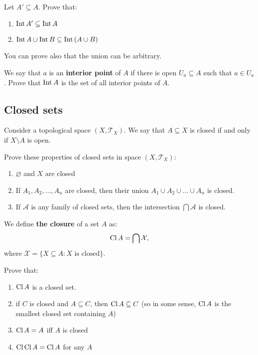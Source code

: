 \begin{prob}
  Let $A'\subseteq A$. Prove that:
  \begin{enumerate}
    \item $\text{Int\,} A' \subseteq \text{Int\,} A$
    \item $\text{Int\,} A \cup \text{Int\,} B\subseteq \text{Int\,} (A\cup B)$
  \end{enumerate}
  You can prove also that the union can be arbitrary.
\end{prob}

\begin{prob}
	We say that $a$ is an \textbf{interior point} of $A$ if there is open $U_a\subseteq A$ such that $a\in U_a$. Prove that $\text{Int\,} A$ is the set
	of all interior points of $A$.
\end{prob}

\subsection{Closed sets}
Consider a topological space $(X, \mathcal T_X)$. We say that $A\subseteq X$ is closed if and only if $X\setminus A$ is open.

\begin{prob}
  Prove these properties of closed sets in space $(X, \mathcal T_X)$:
  \begin{enumerate}
    \item $\varnothing$ and  $X$ are closed
    \item If $A_1, A_2,\dots, A_n$ are closed, then their
      union $A_1\cup A_2\cup\dots\cup A_n$ is closed.
    \item If $\mathcal A$ is any family of
      closed sets, then the intersection $\bigcap \mathcal A$ is
      closed.
  \end{enumerate}
\end{prob}

\noindent We define \textbf{the closure} of a set $A$ as:
$$\text{Cl\,} A = \bigcap \mathcal X,$$
where $\mathcal X = \{X\subseteq A : X \text{ is closed} \}$.

\begin{prob}
  Prove that:
  \begin{enumerate}
    \item $\text{Cl\,} A$ is a closed set.
    \item if $C$ is closed and $A\subseteq C$,
    then $\text{Cl\,} A\subseteq C$ (so in some sense,
    $\text{Cl\,} A$ is the smallest closed set containing $A$)
    \item $\text{Cl\,} A = A$ iff $A$ is closed
    \item $\text{Cl\,} \text{Cl\,} A = \text{Cl\,} A$ for any $A$
  \end{enumerate}
\end{prob}

